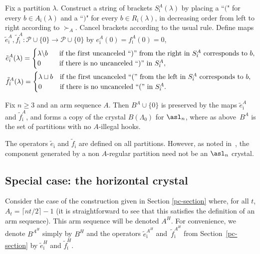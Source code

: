 Fix a partition $\lambda$. Construct a string of brackets $S^A_{\bar \imath}(\lambda)$ by placing a ``$($" for every $b \in A_{\bar \imath}(\lambda)$ and a ``$)$" for every $b \in R_{\bar \imath}(\lambda)$, in decreasing order from left to right according to $\succ_A$. Cancel brackets according to the usual rule. Def\/ine maps $\tilde e^A_{\bar \imath}, \tilde f^A_{\bar \imath}: \mathcal{P} \cup \{ 0 \} \rightarrow \mathcal{P} \cup \{ 0 \}$ by $e^A_{\bar \imath}(0)=f^A_{\bar \imath}(0)=0$,
\begin{gather} \label{Hcryst}
\begin{aligned}
& \tilde e_{\bar \imath}^A(\lambda) =
\begin{cases}
\lambda \backslash b~~ & \text{if the f\/irst uncanceled ``$)$'' from the right in $S^A_{\bar \imath}$ corresponds to $b$}, \\
0 & \text{if there is no uncanceled ``$)$'' in $S^A_{\bar \imath}$},
\end{cases} \\
& \tilde f_{\bar \imath}^A(\lambda)=
\begin{cases}
\lambda \sqcup b & \text{if the f\/irst uncanceled ``$($'' from the left in $S^A_{\bar \imath}$ corresponds to $b$}, \\
0 & \text{if there is no uncanceled ``$($'' in $S^A_{\bar \imath}$}.
\end{cases}
\end{aligned}
\end{gather}


\begin{Theorem} \label{Fayers-th} Fix $n \geq 3$ and an arm sequence $A$. Then $B^A \cup \{ 0 \}$ is preserved by the maps $\tilde e_{\bar \imath}^A$ and $\tilde f_{\bar \imath}^A$, and forms a copy of the crystal $B(\Lambda_0)$ for $\asl_n$, where as above~$B^A$ is the set of partitions with no $A$-illegal hooks.
\end{Theorem}

\begin{Remark} The operators $\tilde e_{\bar \imath}$ and $\tilde f_{\bar \imath}$ are def\/ined on all partitions. However, as noted in~\cite{Fayers:2009}, the component generated by a non $A$-regular partition need not be an $\asl_n$ crystal.
\end{Remark}

\subsection{Special case: the horizontal crystal} \label{flat-section}
Consider the case of the construction given in Section \ref{pc-section} where, for all $t$, $A_t=\lceil nt/2 \rceil-1$ (it is straightforward to see that this satisf\/ies the def\/inition of an arm sequence). This arm sequence will be denoted $A^H$. For convenience, we denote $B^{A^H}$ simply by $B^H$ and the operators $\tilde e_{\bar \imath}^{A^H}$ and~$\tilde f_{\bar \imath}^{A^H}$ from Section~\ref{pc-section} by $\tilde e_{\bar \imath}^{H}$ and $\tilde f_{\bar \imath}^{H}$.

